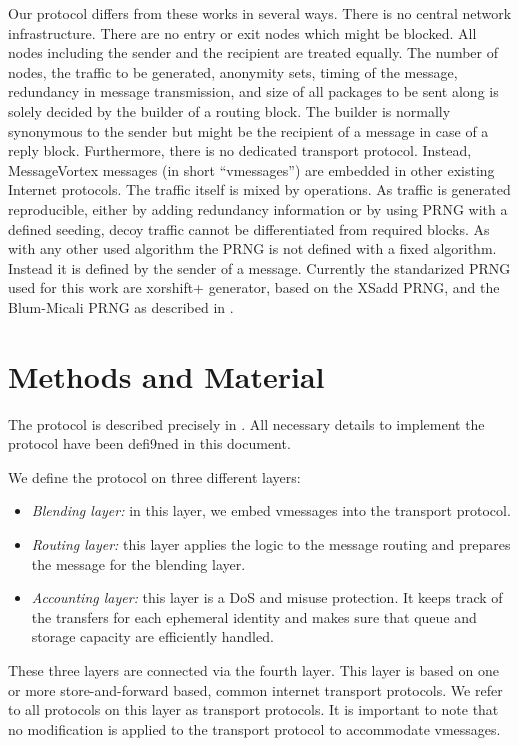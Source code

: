 \documentclass[runningheads]{llncs}
\begin{document}
Our protocol differs from these works in several ways. There is no central network infrastructure. There are no entry or exit nodes which might be blocked. All nodes including the sender and the recipient are treated equally. The number of nodes, the traffic to be generated, anonymity sets, timing of the message, redundancy in message transmission, and size of all packages to be sent along is solely decided by the builder of a routing block. The builder is normally synonymous to the sender but might be the recipient of a message in case of a reply block. Furthermore, there is no dedicated transport protocol. Instead, MessageVortex messages  (in short ``vmessages'') are embedded in other existing Internet protocols. The traffic itself is mixed by operations. As traffic is generated reproducible, either by adding redundancy information or by using PRNG with a defined seeding, decoy traffic cannot be differentiated from required blocks. As with any other used algorithm the PRNG is not defined with a fixed algorithm. Instead it is defined by the sender of a message. Currently the standarized PRNG used for this work are xorshift+ generator, based on the XSadd PRNG\cite{marsaglia2003xorshift}, and the Blum-Micali PRNG as described in \cite{blum1984generate}. 



\section{Methods and Material}

The protocol is described precisely in \cite{MessageVortexRFC}. All necessary details to implement the protocol have been defi9ned in this document. 

We define the protocol on three different layers:
\begin{itemize}
	\item \emph{Blending layer:} in this layer, we embed vmessages into the transport protocol. 
	\item \emph{Routing layer:} this layer applies the logic to the message routing and prepares the message for the blending layer.
	\item \emph{Accounting layer:} this layer is a DoS and misuse protection. It keeps track of the transfers for each ephemeral identity and makes sure that queue and storage capacity are efficiently handled.     
\end{itemize}
These three layers are connected via the fourth layer. This layer is based on one or more store-and-forward based, common internet transport protocols. We refer to all protocols on this layer as transport protocols. It is important to note that no modification is applied to the transport protocol to accommodate vmessages.
\end{document}
